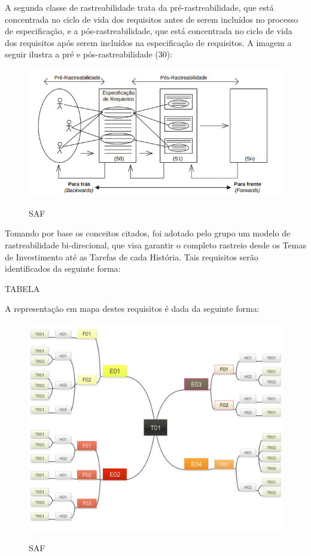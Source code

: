 A segunda classe de rastreabilidade trata da pré-rastreabilidade, que está concentrada no ciclo de vida dos requisitos antes de serem incluídos no processo de especificação, e a pós-rastreabilidade, que está concentrada no ciclo de vida dos requisitos após serem incluídos na especificação de requisitos. A imagem a seguir ilustra a pré e pós-rastreabilidade (30):


\FloatBarrier
\begin{figure}[!htpd]
		\centering
		\caption{SAF}
		\includegraphics[scale=0.27]{figuras/rastrabilidadepre}
		\label{img:SAF}
\end{figure}
\FloatBarrier

Tomando por base os conceitos citados, foi adotado pelo grupo um modelo de rastreabilidade bi-direcional, que visa garantir o completo rastreio desde os Temas de Investimento até as Tarefas de cada História. Tais requisitos serão identificados da seguinte forma:

TABELA

A representação em mapa destes requisitos é dada da seguinte forma:

\FloatBarrier
\begin{figure}[!htpd]
		\centering
		\caption{SAF}
		\includegraphics[scale=0.27]{figuras/T01}
		\label{img:SAF}
\end{figure}
\FloatBarrier
